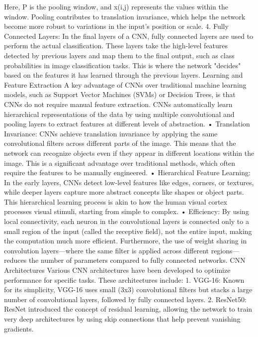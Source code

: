        Here, P is the pooling window, and x(i,j) represents the values within the window. Pooling contributes to translation invariance, which helps the network become more robust to variations in the input's position or scale.
    4. Fully Connected Layers: In the final layers of a CNN, fully connected layers are used to perform the actual classification. These layers take the high-level features detected by previous layers and map them to the final output, such as class probabilities in image classification tasks. This is where the network "decides" based on the features it has learned through the previous layers.
Learning and Feature Extraction
A key advantage of CNNs over traditional machine learning models, such as Support Vector Machines (SVMs) or Decision Trees, is that CNNs do not require manual feature extraction. CNNs automatically learn hierarchical representations of the data by using multiple convolutional and pooling layers to extract features at different levels of abstraction.
    • Translation Invariance: CNNs achieve translation invariance by applying the same convolutional filters across different parts of the image. This means that the network can recognize objects even if they appear in different locations within the image. This is a significant advantage over traditional methods, which often require the features to be manually engineered.
    • Hierarchical Feature Learning: In the early layers, CNNs detect low-level features like edges, corners, or textures, while deeper layers capture more abstract concepts like shapes or object parts. This hierarchical learning process is akin to how the human visual cortex processes visual stimuli, starting from simple to complex.
    • Efficiency: By using local connectivity, each neuron in the convolutional layers is connected only to a small region of the input (called the receptive field), not the entire input, making the computation much more efficient. Furthermore, the use of weight sharing in convolution layers—where the same filter is applied across different regions—reduces the number of parameters compared to fully connected networks.
CNN Architectures
Various CNN architectures have been developed to optimize performance for specific tasks. These architectures include:
    1. VGG-16: Known for its simplicity, VGG-16 uses small (3x3) convolutional filters but stacks a large number of convolutional layers, followed by fully connected layers.
    2. ResNet50: ResNet introduced the concept of residual learning, allowing the network to train very deep architectures by using skip connections that help prevent vanishing gradients.
